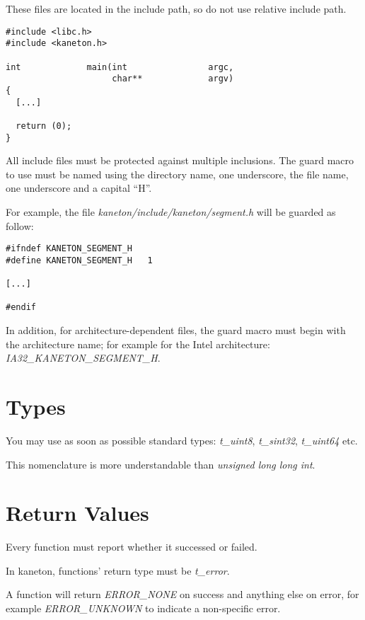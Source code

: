 These files are located in the include path, so do not use relative include
path.

\begin{verbatim}
#include <libc.h>
#include <kaneton.h>

int             main(int                argc,
                     char**             argv)
{
  [...]

  return (0);
}
\end{verbatim}

All include files must be protected against multiple inclusions. The
guard macro to use must be named using the directory name, one underscore,
the file name, one underscore and a capital ``H''.

For example, the file \textit{kaneton/include/kaneton/segment.h} will be
guarded as follow:

\begin{verbatim}
#ifndef KANETON_SEGMENT_H
#define KANETON_SEGMENT_H	1

[...]

#endif
\end{verbatim}

In addition, for architecture-dependent files, the guard macro must begin
with the architecture name; for example for the Intel architecture:
\textit{IA32\_KANETON\_SEGMENT\_H}.

%
%

\section{Types}

You may use as soon as possible standard types: \textit{t\_uint8},
\textit{t\_sint32}, \textit{t\_uint64} etc.

This nomenclature is more understandable than
\textit{unsigned long long int}.

%
%

\section{Return Values}

Every function must report whether it successed or failed.

In kaneton, functions' return type must be \textit{t\_error}.

A function will return \textit{ERROR\_NONE} on success and anything
else on error, for example \textit{ERROR\_UNKNOWN} to indicate a non-specific
error.

